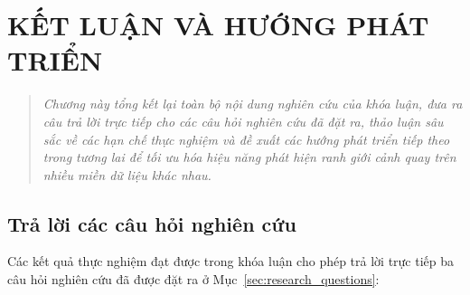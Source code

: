 \chapter{KẾT LUẬN VÀ HƯỚNG PHÁT TRIỂN}
\label{chuong5}
\label{ch:ket_luan}

\vspace{-1.5cm}

\begin{quotation}
    \noindent
    \small\textit{
    Chương này tổng kết lại toàn bộ nội dung nghiên cứu của khóa luận, đưa ra câu trả lời trực tiếp cho các câu hỏi nghiên cứu đã đặt ra, thảo luận sâu sắc về các hạn chế thực nghiệm và đề xuất các hướng phát triển tiếp theo trong tương lai để tối ưu hóa hiệu năng phát hiện ranh giới cảnh quay trên nhiều miền dữ liệu khác nhau.
    }
\end{quotation}
\vspace{1em}

\section{Trả lời các câu hỏi nghiên cứu}
\label{sec:rq_answers}
Các kết quả thực nghiệm đạt được trong khóa luận cho phép trả lời trực tiếp ba câu hỏi nghiên cứu đã được đặt ra ở Mục~\ref{sec:research_questions}:

